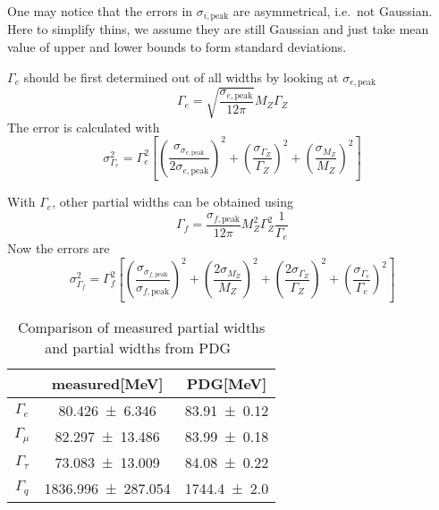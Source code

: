 One may notice that the errors in $\sigma_{i, \text{peak}}$ are asymmetrical, i.e.~not Gaussian. Here to simplify thins, we assume they are still Gaussian and just take mean value of upper and lower bounds to form standard deviations.


$\Gamma_e$ should be first determined out of all widths by looking at $\sigma_{e,\text{peak}}$
\begin{equation}
	\Gamma_e = \sqrt{\frac{\sigma_{e, \text{peak}}}{12\pi}} M_Z \Gamma_Z  
\end{equation}
The error is calculated with
\begin{equation*}
	\sigma_{\Gamma_e}^2 = \Gamma_e^2 \left[ \left( \frac{\sigma_{\sigma_{e, \text{peak}}}}{2 \sigma_{e, \text{peak}}} \right)^2 + \left( \frac{\sigma_{\Gamma_Z}}{\Gamma_Z} \right)^2 + \left( \frac{\sigma_{M_Z}}{M_Z} \right)^2 \right]
\end{equation*}

With $\Gamma_e$, other partial widths can be obtained using
\begin{equation}
	\Gamma_f = \frac{\sigma_{f,\text{peak}}}{12\pi} M_Z^2 \Gamma_Z^2 \frac{1}{\Gamma_e}	
\end{equation}
Now the errors are
\begin{equation*}
	\sigma_{\Gamma_f}^2 = \Gamma_f^2 \left[ \left( \frac{\sigma_{\sigma_{f,\text{peak}}}}{\sigma_{f, \text{peak}}} \right)^2 + \left( \frac{2\sigma_{M_Z}}{M_Z} \right)^2 + \left( \frac{2\sigma_{\Gamma_Z}}{\Gamma_Z} \right)^2 + \left( \frac{\sigma_{\Gamma_e}}{\Gamma_e} \right)^2 \right]
\end{equation*}

\begin{table}[ht]
	\centering
	\label{tab:Gammas}
	\begin{tabular}{ccc} 
		\toprule
	& measured[\si{\mega\eV}] & PDG[\si{\mega\eV}] \\
	\midrule
		$\Gamma_e$ & \num{80.426 +- 6.346} & \num{83.91+-0.12} \\
		$\Gamma_\mu$ & \num{82.297 +- 13.486} & \num{83.99 +- 0.18} \\
		$\Gamma_\tau$ & \num{73.083 +- 13.009} & \num{84.08 +- 0.22}\\
		$\Gamma_q$ & \num{1836.996 +- 287.054} & \num{1744.4 +- 2.0} \\
	\bottomrule
	\end{tabular}
	\caption{Comparison of measured partial widths and partial widths from PDG~\cite{PDG}}
\end{table}

